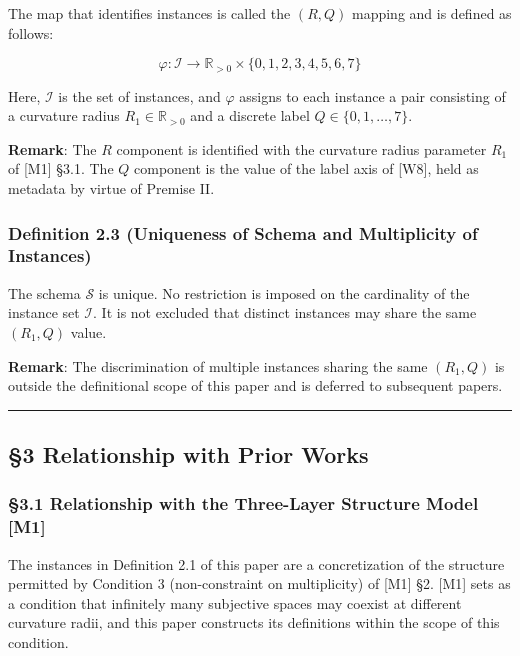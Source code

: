 \documentclass[
  a4paper,11pt]{article}
\theoremstyle{definition}
\theoremstyle{remark}
\begin{document}
The map that identifies instances is called the \((R, Q)\) mapping and
is defined as follows:

\[
\varphi : \mathcal{I} \to \mathbb{R}_{> 0} \times \{0, 1, 2, 3, 4, 5, 6, 7\}
\]

Here, \(\mathcal{I}\) is the set of instances, and \(\varphi\) assigns
to each instance a pair consisting of a curvature radius
\(R_1 \in \mathbb{R}_{> 0}\) and a discrete label
\(Q \in \{0, 1, \ldots, 7\}\).

\textbf{Remark}: The \(R\) component is identified with the curvature
radius parameter \(R_1\) of {[}M1{]} §3.1. The \(Q\) component is the
value of the label axis of {[}W8{]}, held as metadata by virtue of
Premise II.

\subsubsection{Definition 2.3 (Uniqueness of Schema and Multiplicity of
Instances)}\label{definition-2.3-uniqueness-of-schema-and-multiplicity-of-instances}

The schema \(\mathcal{S}\) is unique. No restriction is imposed on the
cardinality of the instance set \(\mathcal{I}\). It is not excluded that
distinct instances may share the same \((R_1, Q)\) value.

\textbf{Remark}: The discrimination of multiple instances sharing the
same \((R_1, Q)\) is outside the definitional scope of this paper and is
deferred to subsequent papers.

\begin{center}\rule{0.5\linewidth}{0.5pt}\end{center}

\subsection{§3 Relationship with Prior
Works}\label{relationship-with-prior-works}

\subsubsection{§3.1 Relationship with the Three-Layer Structure Model
{[}M1{]}}\label{relationship-with-the-three-layer-structure-model-m1}

The instances in Definition 2.1 of this paper are a concretization of
the structure permitted by Condition 3 (non-constraint on multiplicity)
of {[}M1{]} §2. {[}M1{]} sets as a condition that infinitely many
subjective spaces may coexist at different curvature radii, and this
paper constructs its definitions within the scope of this condition.
\end{document}
